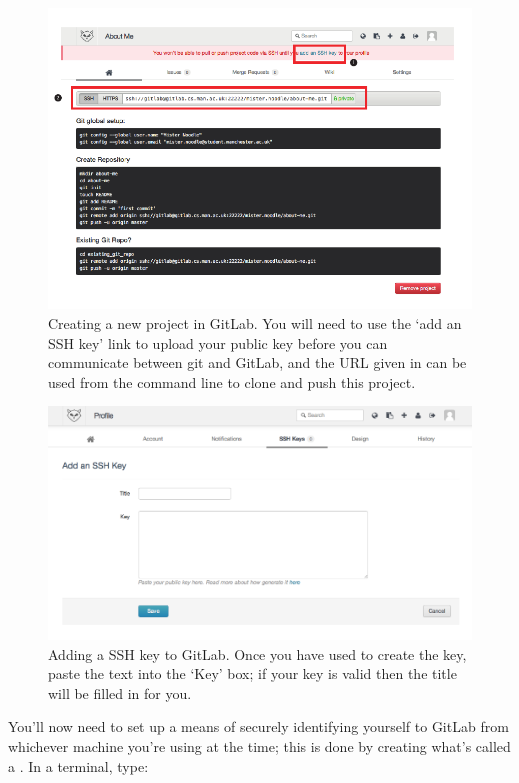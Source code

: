\begin{figure}
\centerline{\includegraphics[width=15cm]{images/GitLab-new-project}}
\caption{Creating a new project in GitLab. \protect{} You will need to use the  `add an SSH key' link to upload your public key before you can communicate between git and GitLab, and the URL given in \protect{} can be used from the command line to clone and push this project.}\label{figure:GitLab-new-project}
\end{figure}

\begin{figure}
\centerline{\includegraphics[width=13cm]{images/GitLab-ssh}}
\caption{Adding a SSH key to GitLab. Once you have used  to create the key, paste the text into the `Key' box; if your key is valid then the title will be filled in for you.}\label{figure:GitLab-ssh}
\end{figure}

You'll now need to set up a means of securely identifying yourself to GitLab from whichever machine you're using at the time; this is done by creating what's called a . In a terminal, type:


